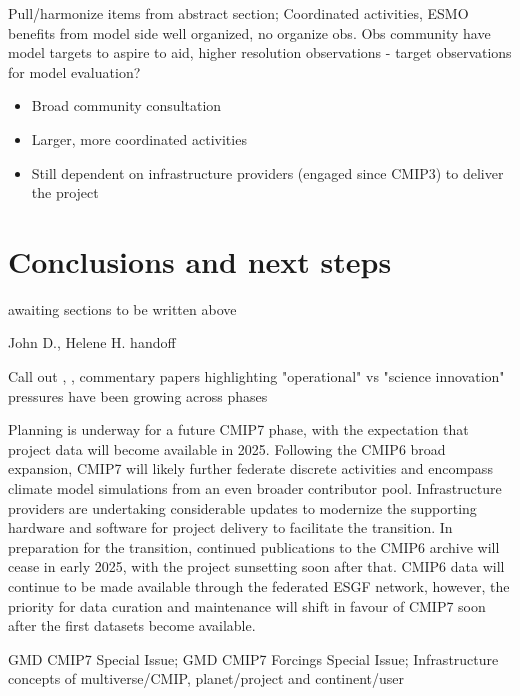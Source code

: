 \documentclass[gmd, preprint]{copernicus}
\def\cred#1{{\color{red}#1}}
\begin{document}
\cred{Pull/harmonize items from abstract section; Coordinated activities, ESMO benefits from model side well organized, no organize obs. Obs community have model targets to aspire to aid, higher resolution observations - target observations for model evaluation?}


\cred{
\begin{itemize}
	\item Broad community consultation
	\item Larger, more coordinated activities
	\item Still dependent on infrastructure providers (engaged since CMIP3) to deliver the project
\end{itemize}
}


\section{Conclusions and next steps} %
\label{sec:Conclusions}
\cred{awaiting sections to be written above}

\cred{John D., Helene H. handoff}

\cred{Call out \citet{shukla_strategies_2009,shukla_toward_2010}, \citep{jakob_need_2023}, \citep{stevens_perspective_2024} commentary papers highlighting "operational" vs "science innovation" pressures have been growing across phases}

Planning is underway for a future CMIP7 phase, with the expectation that project data will become available in 2025. Following the CMIP6 broad expansion, CMIP7 will likely further federate discrete activities and encompass climate model simulations from an even broader contributor pool. Infrastructure providers are undertaking considerable updates to modernize the supporting hardware and software for project delivery to facilitate the transition. In preparation for the transition, continued publications to the CMIP6 archive will cease in early 2025, with the project sunsetting soon after that. CMIP6 data will continue to be made available through the federated ESGF network, however, the priority for data curation and maintenance will shift in favour of CMIP7 soon after the first datasets become available.

\cred{GMD CMIP7 Special Issue; GMD CMIP7 Forcings Special Issue; Infrastructure concepts of multiverse/CMIP, planet/project and continent/user}
\end{document}
